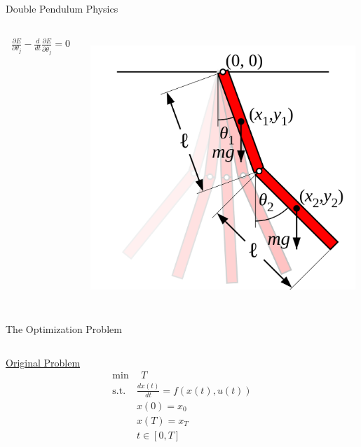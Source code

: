 \documentclass[final]{beamer}
\begin{document}
\begin{frame}{}
{\begin{columns}[t]
\begin{column}{.30\linewidth}
\begin{block}{\centering Double Pendulum Physics}
\begin{columns}[T]
\begin{column}{16cm}{}
\begin{align*}
\frac{\partial E}{\partial \theta_j} - 
\frac{d}{dt}\frac{\partial E}{\partial \dot{\theta_j}} = 0
\end{align*}
\end{column}
\begin{column}{16cm}{}
\centering\includegraphics[height=10cm, width = 10cm]{figures/double-pendulum.png}\\
\end{column}

\end{columns}

\end{block}

                
                

\begin{block}{\centering The Optimization Problem}


\begin{columns}[T]

\begin{column}{10cm}{}

	\underline{Original Problem}
\begin{align*}
\min  & \: \:T \\
\mbox{s.t. } & \frac{dx(t)}{dt} = f(x(t),u(t)) \\
& x(0) = x_0 \\
& x(T) = x_T \\
& t \in [0, T]
\end{align*}




\end{column}
\end{columns}
\end{block}
\end{column}
\end{columns}}
\end{frame}
\end{document}
